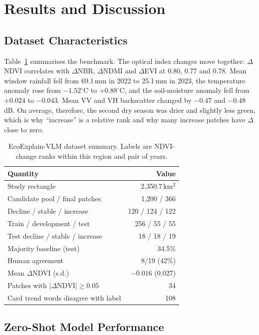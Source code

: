 \documentclass[11pt]{article}
\begin{document}
\section{Results and Discussion}

\subsection{Dataset Characteristics}

Table~\ref{tab:data} summarises the benchmark. The optical index changes
move together: $\Delta$NDVI correlates with $\Delta$NBR, $\Delta$NDMI
and $\Delta$EVI at 0.80, 0.77 and 0.78. Mean window rainfall fell from
69.1\,mm in 2022 to 25.1\,mm in 2023, the temperature anomaly rose from
$-1.52^\circ$C to $+0.88^\circ$C, and the soil-moisture anomaly fell
from $+0.024$ to $-0.043$. Mean VV and VH backscatter changed by $-0.47$
and $-0.48$\,dB. On average, therefore, the second dry season was drier
and slightly less green, which is why ``increase'' is a relative rank
and why many increase patches have $\Delta$ close to zero.

\begin{table}[t]
\centering
\small
\begin{tabular}{lr}
\toprule
Quantity & Value \\
\midrule
Study rectangle & 2,350.7\,km$^2$ \\
Candidate pool / final patches & 1,200 / 366 \\
Decline / stable / increase & 120 / 124 / 122 \\
Train / development / test & 256 / 55 / 55 \\
Test decline / stable / increase & 18 / 18 / 19 \\
Majority baseline (test) & 34.5\% \\
Human agreement & 8/19 (42\%) \\
Mean $\Delta$NDVI (s.d.) & $-0.016$ (0.027) \\
Patches with $|\Delta\mathrm{NDVI}| \ge 0.05$ & 34 \\
Card trend words disagree with label & 108 \\
\bottomrule
\end{tabular}
\caption{EcoExplain-VLM dataset summary. Labels are NDVI-change ranks
within this region and pair of years.}
\label{tab:data}
\end{table}

\subsection{Zero-Shot Model Performance}
\end{document}
